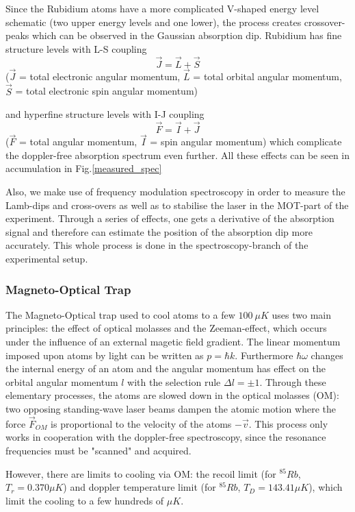 \documentclass[12pt, a4paper]{article}
\begin{document}
Since the Rubidium atoms have a more complicated V-shaped energy level schematic (two upper energy levels and one lower), the process creates crossover-peaks which can be observed in the Gaussian absorption dip.
Rubidium has fine structure levels with L-S coupling
\begin{equation}
\vec{J} = \vec{L} + \vec{S}
\end{equation}
($\vec{J}$ = total electronic angular momentum, $\vec{L}$ = total orbital angular momentum, $\vec{S}$ = total electronic spin angular momentum)

and hyperfine structure levels with I-J coupling
\begin{equation}
\vec{F} = \vec{I} + \vec{J}
\end{equation}
($\vec{F}$ = total angular momentum, $\vec{I}$ = spin angular momentum)
which complicate the doppler-free absorption spectrum even further.
All these effects can be seen in accumulation in Fig.\ref{measured_spec}

Also, we make use of frequency modulation spectroscopy in order to measure the Lamb-dips and cross-overs as well as to stabilise the laser in the MOT-part of the experiment. Through a series of effects, one gets a derivative of the absorption signal and therefore can estimate the position of the absorption dip more accurately. This whole process is done in the spectroscopy-branch of the experimental setup. \cite{script}

\subsubsection{Magneto-Optical Trap}
The Magneto-Optical trap used to cool atoms to a few $100\ \mu  K$ uses two main principles: the effect of optical molasses and the Zeeman-effect, which occurs under the influence of an external magetic field gradient. The linear momentum imposed upon atoms by light can be written as $p=\hbar k$. Furthermore $\hbar \omega$ changes the internal energy of an atom and the angular momentum has effect on the orbital angular momentum $l$ with the selection rule $\Delta l=\pm 1$. Through these elementary processes, the atoms are slowed down in the optical molasses (OM): two opposing standing-wave laser beams dampen the atomic motion where the force $\vec{F}_{OM}$ is proportional to the velocity of the atoms $-\vec{v}$. This process only works in cooperation with the doppler-free spectroscopy, since the resonance frequencies must be "scanned" and acquired.

However, there are limits to cooling via OM: the recoil limit (for $^{85}Rb$, $T_r = 0.370\mu K$) and doppler temperature limit (for $^{85}Rb$, $T_D = 143.41\mu K$), which limit the cooling to a few hundreds of $\mu K$.
\end{document}
